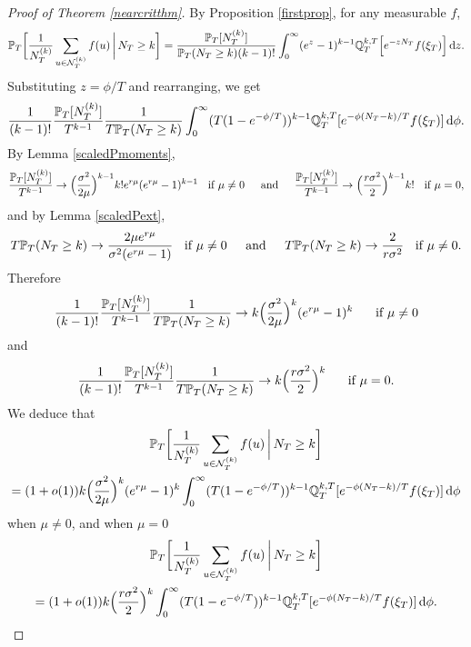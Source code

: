 \documentclass{article}
\theoremstyle{plain}
\theoremstyle{definition}
\newcommand{\Q}{\mathbb{Q}}
\renewcommand{\P}{\mathbb{P}}
\newcommand{\Nc}{\mathcal{N}}
\renewcommand{\d}{{\rm{d}}}
\begin{document}
\begin{proof}[Proof of Theorem \ref{nearcritthm}]
By Proposition \ref{firstprop}, for any measurable $f$,
\[\P_T\bigg[\frac{1}{N_T^{(k)}} \sum_{u\in \Nc_T^{(k)}} f(u) \, \bigg| \, N_T \ge k\bigg] = \frac{\P_T[N_T^{(k)}]}{\P_T(N_T\ge k)(k-1)!} \int_0^\infty (e^z-1)^{k-1} \Q^{k,T}_T\Big[e^{-zN_T} f(\xi_T)\Big]\,\d z.\]
Substituting $z = \phi/T$ and rearranging, we get
\[\frac{1}{(k-1)!}\frac{\P_T[N_T^{(k)}]}{T^{k-1}}\frac{1}{T\P_T(N_T\ge k)}\int_0^\infty (T(1-e^{-\phi/T}))^{k-1}\Q^{k,T}_T[e^{-\phi(N_T-k)/T} f(\xi_T)]\, \d\phi.\]
By Lemma \ref{scaledPmoments},
\[\frac{\P_T[N_T^{(k)}]}{T^{k-1}} \to \Big(\frac{\sigma^2}{2\mu}\Big)^{k-1} k! e^{r\mu}(e^{r\mu}-1)^{k-1} \hspace{2mm} \hbox{ if } \mu\neq 0 \hspace{4mm} \hbox{ and } \hspace{4mm}  \frac{\P_T[N_T^{(k)}]}{T^{k-1}} \to \Big(\frac{r\sigma^2}{2}\Big)^{k-1} k! \hspace{2mm} \hbox{ if } \mu= 0,\]
and by Lemma \ref{scaledPext},
\[T\P_T(N_T\ge k) \to \frac{2\mu e^{r\mu}}{\sigma^2(e^{r\mu}-1)} \hspace{2mm} \hbox{ if } \mu\neq 0 \hspace{4mm} \hbox{ and } \hspace{4mm} T\P_T(N_T\ge k) \to \frac{2}{r\sigma^2} \hspace{2mm} \hbox{ if } \mu\neq 0.\]
Therefore
\[\frac{1}{(k-1)!}\frac{\P_T[N_T^{(k)}]}{T^{k-1}}\frac{1}{T\P_T(N_T\ge k)} \to k\Big(\frac{\sigma^2}{2\mu}\Big)^k(e^{r\mu}-1)^k\hspace{5mm} \hbox{ if } \mu\neq 0\]
and
\[\frac{1}{(k-1)!}\frac{\P_T[N_T^{(k)}]}{T^{k-1}}\frac{1}{T\P_T(N_T\ge k)} \to k\Big(\frac{r\sigma^2}{2}\Big)^k\hspace{5mm} \hbox{ if } \mu= 0.\]
We deduce that
\begin{multline}\label{keyfreln}
\P_T\bigg[\frac{1}{N_T^{(k)}} \sum_{u\in \Nc_T^{(k)}} f(u) \, \bigg| \, N_T \ge k\bigg]\\
= (1+o(1))k\Big(\frac{\sigma^2}{2\mu}\Big)^k(e^{r\mu}-1)^k \int_0^\infty (T(1-e^{-\phi/T}))^{k-1}\Q^{k,T}_T[e^{-\phi(N_T-k)/T} f(\xi_T)]\, \d\phi
\end{multline}
when $\mu\neq 0$, and when $\mu=0$
\begin{multline*}
\P_T\bigg[\frac{1}{N_T^{(k)}} \sum_{u\in \Nc_T^{(k)}} f(u) \, \bigg| \, N_T \ge k\bigg]\\
= (1+o(1))k\Big(\frac{r\sigma^2}{2}\Big)^k \int_0^\infty (T(1-e^{-\phi/T}))^{k-1}\Q^{k,T}_T[e^{-\phi(N_T-k)/T} f(\xi_T)]\, \d\phi.
\end{multline*}


\end{proof}
\end{document}
